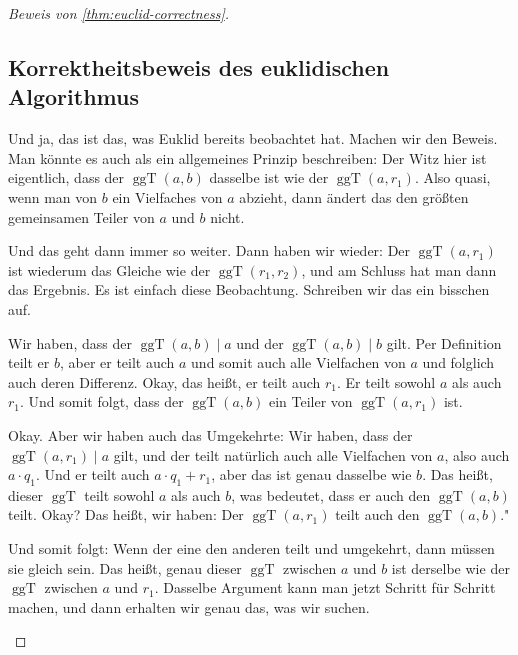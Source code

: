 \begin{proof}[Beweis von \cref{thm:euclid-correctness}]

\subsection{Korrektheitsbeweis des euklidischen Algorithmus}

\begin{spoken-clean}[00:34:13 - 00:37:41]
Und ja, das ist das, was Euklid bereits beobachtet hat. Machen wir den Beweis. Man könnte es auch als ein allgemeines Prinzip beschreiben: Der Witz hier ist eigentlich, dass der $\operatorname{ggT}(a, b)$ dasselbe ist wie der $\operatorname{ggT}(a, r_1)$. Also quasi, wenn man von $b$ ein Vielfaches von $a$ abzieht, dann ändert das den größten gemeinsamen Teiler von $a$ und $b$ nicht.

Und das geht dann immer so weiter. Dann haben wir wieder: Der $\operatorname{ggT}(a, r_1)$ ist wiederum das Gleiche wie der $\operatorname{ggT}(r_1, r_2)$, und am Schluss hat man dann das Ergebnis. Es ist einfach diese Beobachtung. Schreiben wir das ein bisschen auf.

Wir haben, dass der $\operatorname{ggT}(a, b) \mid a$ und der $\operatorname{ggT}(a, b) \mid b$ gilt. Per Definition teilt er $b$, aber er teilt auch $a$ und somit auch alle Vielfachen von $a$ und folglich auch deren Differenz. Okay, das heißt, er teilt auch $r_1$. Er teilt sowohl $a$ als auch $r_1$. Und somit folgt, dass der $\operatorname{ggT}(a, b)$ ein Teiler von $\operatorname{ggT}(a, r_1)$ ist.

Okay. Aber wir haben auch das Umgekehrte: Wir haben, dass der $\operatorname{ggT}(a, r_1) \mid a$ gilt, und der teilt natürlich auch alle Vielfachen von $a$, also auch $a \cdot q_1$. Und er teilt auch $a \cdot q_1 + r_1$, aber das ist genau dasselbe wie $b$. Das heißt, dieser $\operatorname{ggT}$ teilt sowohl $a$ als auch $b$, was bedeutet, dass er auch den $\operatorname{ggT}(a, b)$ teilt. Okay? Das heißt, wir haben: Der $\operatorname{ggT}(a, r_1)$ teilt auch den $\operatorname{ggT}(a, b)$."

Und somit folgt: Wenn der eine den anderen teilt und umgekehrt, dann müssen sie gleich sein. Das heißt, genau dieser $\operatorname{ggT}$ zwischen $a$ und $b$ ist derselbe wie der $\operatorname{ggT}$ zwischen $a$ und $r_1$. Dasselbe Argument kann man jetzt Schritt für Schritt machen, und dann erhalten wir genau das, was wir suchen.
\end{spoken-clean}


\end{proof}
